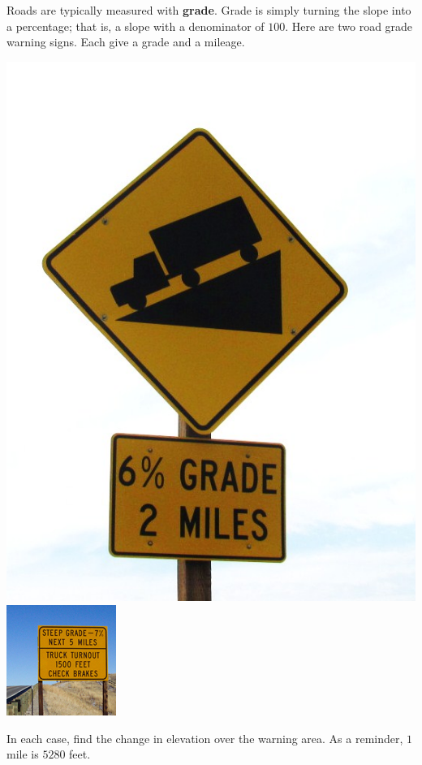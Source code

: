 \documentclass[noauthor,nooutcomes,hints,handout]{ximera}
\begin{document}
\begin{question}
Roads are typically measured with \textbf{grade}. Grade is simply
turning the slope into a percentage; that is, a slope with a
denominator of $100$.  Here are two road grade warning signs. Each
give a grade and a mileage.
\begin{center}
\includegraphics[width=.4\textwidth]{gradeWarning}
\includegraphics[width=.3\textwidth]{truckGradeWarning}
\end{center}
In each case, find the change in elevation over the warning area. As a
reminder, $1$ mile is $5280$ feet.
\end{question}
\end{document}
